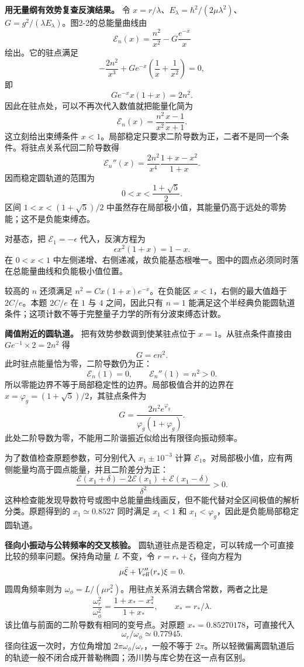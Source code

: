 \documentclass[12pt,a4paper,UTF8]{ctexart}
\begin{document}
\textbf{用无量纲有效势复查反演结果。} 令
\(x=r/\lambda\)、\(E_\lambda=\hbar^2/(2\mu\lambda^2)\)、\(G=g^2/(\lambda E_\lambda)\)。图2-2的总能量曲线由
\[
\mathcal E_n(x)=\frac{n^2}{x^2}-G\frac{e^{-x}}x
\] 绘出。它的驻点满足 \[
-\frac{2n^2}{x^3}+G e^{-x}\left(\frac1x+\frac1{x^2}\right)=0,
\] 即 \[
G e^{-x}x(1+x)=2n^2.
\] 因此在驻点处，可以不再次代入数值就把能量化简为 \[
\mathcal E_n(x)=\frac{n^2}{x^2}\frac{x-1}{x+1}.
\] 这立刻给出束缚条件
\(x<1\)。局部稳定只要求二阶导数为正，二者不是同一个条件。将驻点关系代回二阶导数得
\[
\mathcal E_n''(x)=\frac{2n^2}{x^4}\frac{1+x-x^2}{1+x}.
\] 因而稳定圆轨道的范围为 \[
0<x<\frac{1+\sqrt5}{2}.
\] 区间 \(1<x<(1+\sqrt5)/2\)
中虽然存在局部极小值，其能量仍高于远处的零势能；这不是负能束缚态。

对基态，把 \(\mathcal E_1=-\epsilon\) 代入，反演方程为 \[
\epsilon x^2(1+x)=1-x.
\] 在 \(0<x<1\)
中左侧递增、右侧递减，故负能基态根唯一。图中的圆点必须同时落在总能量曲线和负能极小值位置。

较高的 \(n\) 还须满足 \(n^2=Cx(1+x)e^{-x}\)。在负能区
\(x<1\)，右侧的最大值趋于 \(2C/e\)。本题 \(2C/e\) 在 \(1\) 与 \(4\)
之间，因此只有 \(n=1\)
能满足这个半经典负能圆轨道条件；这项计数不等于完整量子力学的所有分波束缚态计数。

\textbf{阈值附近的圆轨道。} 把有效势参数调到使某驻点位于
\(x=1\)。从驻点条件直接由 \(G e^{-1}\times2=2n^2\) 得 \[
G=en^2.
\] 此时驻点能量恰为零，二阶导数仍为正： \[
\mathcal E_n(1)=0,
\qquad \mathcal E_n''(1)=n^2>0.
\] 所以零能边界不等于局部稳定性的边界。局部极值合并的边界在
\(x=\varphi_g=(1+\sqrt5)/2\)，其驻点条件为 \[
G=\frac{2n^2e^{\varphi_g}}{\varphi_g(1+\varphi_g)}.
\] 此处二阶导数为零，不能用二阶谐振近似给出有限径向振动频率。

为了数值检查原题参数，可分别代入 \(x_1\pm10^{-3}\) 计算
\(\mathcal E_1\)。对局部极小值，应有两侧能量均高于圆点能量，并且二阶差分为正：
\[
\frac{\mathcal E(x_1+\delta)-2\mathcal E(x_1)+\mathcal E(x_1-\delta)}{\delta^2}>0.
\]
这种检查能发现导数符号或图中总能量曲线画反，但不能代替对全区间极值的解析分类。原题得到的
\(x_1\simeq0.8527\) 同时满足 \(x_1<1\) 和
\(x_1<\varphi_g\)，因此是负能局部稳定圆轨道。

\textbf{径向小振动与公转频率的交叉核验。}
圆轨道驻点是否稳定，可以转成一个可直接比较的频率问题。保持角动量 \(L\)
不变，令 \(r=r_*+\xi\)，径向方程为 \[
\mu\ddot\xi+V_{\rm eff}''(r_*)\xi=0.
\] 圆周角频率则为
\(\omega_\phi=L/(\mu r_*^2)\)。用驻点关系消去耦合常数，两者之比是 \[
\frac{\omega_r^2}{\omega_\phi^2}=
\frac{1+x_*-x_*^2}{1+x_*},\qquad x_*=r_*/\lambda.
\] 该比值与前面的二阶导数有相同的变号点。对原题
\(x_*=0.85270178\)，可直接代入 \[
\omega_r/\omega_\phi\simeq0.77945.
\] 径向往返一次时，方位角增加 \(2\pi\omega_\phi/\omega_r\)，一般不等于
\(2\pi\)。所以轻微偏离圆轨道后的轨迹一般不闭合成开普勒椭圆；汤川势与库仑势在这一点有区别。
\end{document}
